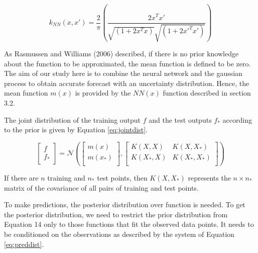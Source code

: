 \begin{equation}\label{eq:gpcov}
 k_{NN} \left( x, x' \right) = \frac{2}{ \pi } \left( \frac{2x^{T}x'}{\sqrt{ \left( 1+2x^{T} x \right) }\sqrt{ \left( 1+2x'^{T}x' \right)}} \right)
\end{equation}


As Rasmussen and Williams (2006) described, if there is no prior knowledge about the function to be approximated, 
the mean function is defined to be zero. The aim of our study here is to combine the neural network and the 
gaussian process to obtain accurate forecast with an uncertainty distribution. Hence, the mean function  
\( m \left( x \right)  \)  is provided by the  \( NN \left( x \right)  \)  function described in section 3.2.


The joint distribution of the training output  \( f \)  and the test outputs  \( f_{\ast} \)  according to the 
prior is given by Equation \ref{eq:jointdist}. 

\begin{equation}\label{eq:jointdist}
  \left[ \begin{array}{ll}
	f\\
	f_{\ast}\\
	\end{array} \right] = \mathcal{N}   \left(  \left[ \begin{array}{ll}
	m \left( x \right) \\
	m \left( x_{\ast} \right) \\
	\end{array} \right] ,  \left[ \begin{matrix}
K \left( X,X \right)   &  K \left( X,X_{\ast} \right) \\
K \left( X_{\ast},X \right)   &  K \left( X_{\ast},X_{\ast} \right) \\
\end{matrix}
 \right]  \right) 
\end{equation}


If there are  \( n \)  training and  \( n_{\ast} \)  test points, then  \( K \left( X,X_{\ast} \right)  \)  
represents the  \( n \times n_{\ast} \)  matrix of the covariance of all pairs of training and test points. 



To make predictions, the posterior distribution over function is needed. To get the posterior distribution, 
we need to restrict the prior distribution from Equation 14 only to those functions that fit the observed data points. 
It needs to be conditioned on the observations as described by the system of Equation \ref{eq:preddist}.



